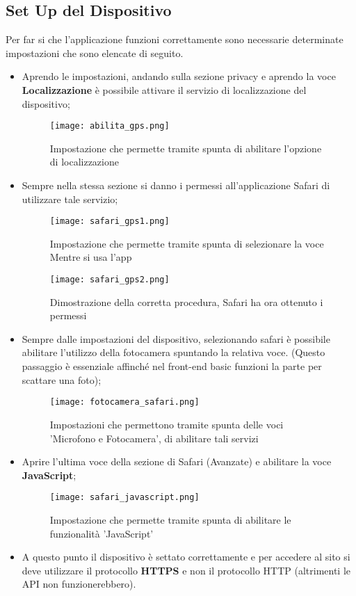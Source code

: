 \subsection{Set Up del Dispositivo}
Per far si che l'applicazione funzioni correttamente sono necessarie determinate impostazioni che sono elencate di seguito.
\begin{itemize}
\item Aprendo le impostazioni, andando sulla sezione privacy e aprendo la voce \textbf{Localizzazione} è possibile attivare il servizio di localizzazione del dispositivo;

\begin{figure}[H]
	\centering
	\caption{Impostazione che permette tramite spunta di abilitare l'opzione di localizzazione}
	\texttt{[image: abilita\_gps.png]}
\end{figure} 

\item Sempre nella stessa sezione si danno i permessi all'applicazione Safari di utilizzare tale servizio;

\begin{figure}[H]
	\centering
	\caption{Impostazione che permette tramite spunta di selezionare la voce Mentre si usa l'app}
	\texttt{[image: safari\_gps1.png]}
\end{figure} 

\begin{figure}[H]
	\centering
	\caption{Dimostrazione della corretta procedura, Safari ha ora ottenuto i permessi}
	\texttt{[image: safari\_gps2.png]}
\end{figure} 


\item Sempre dalle impostazioni del dispositivo, selezionando safari è possibile abilitare l'utilizzo della fotocamera spuntando la relativa voce. (Questo passaggio è essenziale affinché nel front-end basic funzioni la parte per scattare una foto);
\begin{figure}[h]
	\centering
	\caption{Impostazioni che permettono tramite spunta delle voci 'Microfono e Fotocamera', di abilitare tali servizi}
	\texttt{[image: fotocamera\_safari.png]}
\end{figure} 
\item Aprire l'ultima voce della sezione di Safari (Avanzate) e abilitare la voce \textbf{JavaScript};
\begin{figure}[h]
	\centering
	\caption{Impostazione che permette tramite spunta di abilitare le funzionalità 'JavaScript'}
	\texttt{[image: safari\_javascript.png]}
\end{figure} 

\item A questo punto il dispositivo è settato correttamente e per accedere al sito si deve utilizzare il protocollo \textbf{HTTPS} e non il protocollo HTTP (altrimenti le API non funzionerebbero).

\end{itemize}

